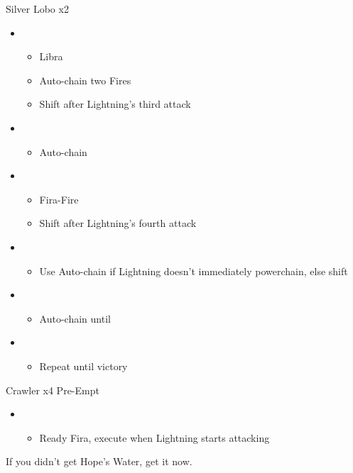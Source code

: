 \begin{multicols}{2}
\begin{battle}{Silver Lobo x2}
\begin{itemize}
    \item \first
    \begin{itemize}
        \item Libra
        \item Auto-chain two Fires
        \item Shift after Lightning's third attack
    \end{itemize}
    \item \fourth
    \begin{itemize}
        \item Auto-chain
    \end{itemize}
    \item \sixth
    \begin{itemize}
        \item Fira-Fire
        \item Shift after Lightning's fourth attack
    \end{itemize}
    \item \first
    \begin{itemize}
        \item Use Auto-chain if Lightning doesn't immediately powerchain, else shift
    \end{itemize}
    \item \fourth
    \begin{itemize}
        \item Auto-chain until \stagger
    \end{itemize}
    \item \sixth
    \begin{itemize}
        \item Repeat until victory
    \end{itemize}
\end{itemize}
\end{battle}
\vfill

\begin{battle}{Crawler x4 Pre-Empt}
\begin{itemize}
    \item \first
    \begin{itemize}
        \item Ready Fira, execute when Lightning starts attacking
    \end{itemize}
\end{itemize}
\end{battle}
If you didn't get Hope's Water, get it now.


\end{multicols}
